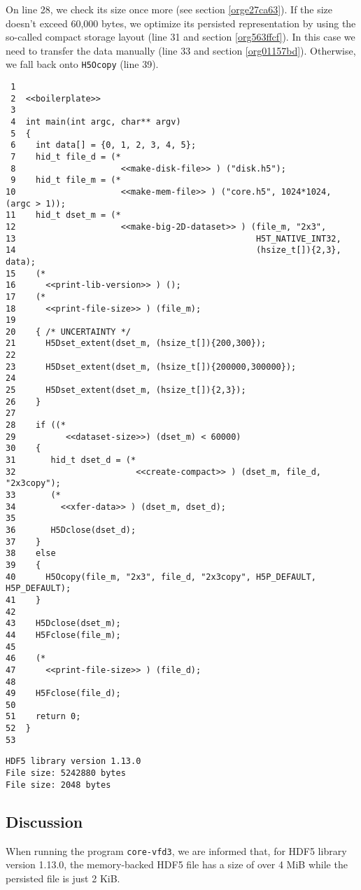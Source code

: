 \documentclass[a4paper, 12pt]{article}
\begin{document}
On line 28, we check its size once more (see section
\ref{orge27ca63}). If the size doesn't exceed 60,000 bytes, we optimize its
persisted representation by using the so-called compact storage layout (line
31 and section \ref{org563ffcf}). In this case we need to transfer
the data manually (line 33 and section \ref{org01157bd}).
Otherwise, we fall back onto \texttt{H5Ocopy} (line 39).

\begin{verbatim}
 1
 2  <<boilerplate>>
 3
 4  int main(int argc, char** argv)
 5  {
 6    int data[] = {0, 1, 2, 3, 4, 5};
 7    hid_t file_d = (*
 8                     <<make-disk-file>> ) ("disk.h5");
 9    hid_t file_m = (*
10                     <<make-mem-file>> ) ("core.h5", 1024*1024, (argc > 1));
11    hid_t dset_m = (*
12                     <<make-big-2D-dataset>> ) (file_m, "2x3",
13                                                H5T_NATIVE_INT32,
14                                                (hsize_t[]){2,3}, data);
15    (*
16      <<print-lib-version>> ) ();
17    (*
18      <<print-file-size>> ) (file_m);
19
20    { /* UNCERTAINTY */
21      H5Dset_extent(dset_m, (hsize_t[]){200,300});
22
23      H5Dset_extent(dset_m, (hsize_t[]){200000,300000});
24
25      H5Dset_extent(dset_m, (hsize_t[]){2,3});
26    }
27
28    if ((*
29          <<dataset-size>>) (dset_m) < 60000)
30    {
31       hid_t dset_d = (*
32                        <<create-compact>> ) (dset_m, file_d, "2x3copy");
33       (*
34         <<xfer-data>> ) (dset_m, dset_d);
35
36       H5Dclose(dset_d);
37    }
38    else
39    {
40      H5Ocopy(file_m, "2x3", file_d, "2x3copy", H5P_DEFAULT, H5P_DEFAULT);
41    }
42
43    H5Dclose(dset_m);
44    H5Fclose(file_m);
45
46    (*
47      <<print-file-size>> ) (file_d);
48
49    H5Fclose(file_d);
50
51    return 0;
52  }
53
\end{verbatim}

\begin{verbatim}
HDF5 library version 1.13.0
File size: 5242880 bytes
File size: 2048 bytes
\end{verbatim}

\subsection{Discussion}
\label{sec:org2079029}

When running the program \texttt{core-vfd3}, we are informed that, for HDF5 library
version 1.13.0, the memory-backed HDF5 file has a size of over 4 MiB while
the persisted file is just 2 KiB.
\end{document}
